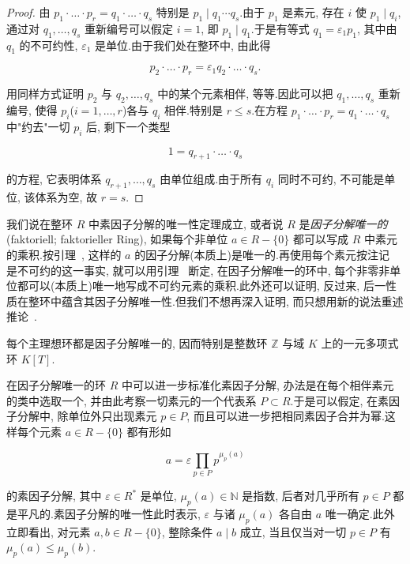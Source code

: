 \begin{proof}
由 $p_1 \cdot \ldots \cdot p_r = q_1 \cdot \ldots \cdot q_s$ 特别是 $p_1 \mid q_1 \cdots q_s$.由于 $p_1$ 是素元, 存在 $i$ 使 $p_1 \mid q_i$, 通过对 $q_1, \ldots, q_s$ 重新编号可以假定 $i = 1$, 即 $p_1 \mid q_1$.于是有等式 $q_1 = \varepsilon_1 p_1$, 其中由 $q_1$ 的不可约性, $\varepsilon_1$ 是单位.由于我们处在整环中, 由此得

\[
p_2 \cdot \ldots \cdot p_r = \varepsilon_1 q_2 \cdot \ldots \cdot q_s\text{.}
\]

用同样方式证明 $p_2$ 与 $q_2, \ldots, q_s$ 中的某个元素相伴, 等等.因此可以把 $q_1, \ldots, q_s$ 重新编号, 使得 $p_i$($i = 1, \ldots, r$)各与 $q_i$ 相伴.特别是 $r \leq s$.在方程 $p_1 \cdot \ldots \cdot p_r = q_1 \cdot \ldots \cdot q_s$ 中"约去"一切 $p_i$ 后, 剩下一个类型

\[
1 = q_{r + 1} \cdot \ldots \cdot q_s
\]

的方程, 它表明体系 $q_{r + 1}, \ldots, q_s$ 由单位组成.由于所有 $q_i$ 同时不可约, 不可能是单位, 该体系为空, 故 $r = s$.
\end{proof}

我们说在整环 $R$ 中素因子分解的唯一性定理成立, 或者说 $R$ 是\emph{因子分解唯一的}(\textup{faktoriell; faktorieller Ring}), 如果每个非单位 $a \in R - \{0\}$ 都可以写成 $R$ 中素元的乘积.按引理~, 这样的 $a$ 的因子分解(本质上)是唯一的.再使用每个素元按注记~ 是不可约的这一事实, 就可以用引理~ 断定, 在因子分解唯一的环中, 每个非零非单位都可以(本质上)唯一地写成不可约元素的乘积.此外还可以证明, 反过来, 后一性质在整环中蕴含其因子分解唯一性.但我们不想再深入证明, 而只想用新的说法重述推论~.

\begin{theorem}\label{thm:5.2.15}
每个主理想环都是因子分解唯一的, 因而特别是整数环 $\mathbb{Z}$ 与域 $K$ 上的一元多项式环 $K[T]$.
\end{theorem}

在因子分解唯一的环 $R$ 中可以进一步标准化素因子分解, 办法是在每个相伴素元的类中选取一个, 并由此考察一切素元的一个代表系 $P \subset R$.于是可以假定, 在素因子分解中, 除单位外只出现素元 $p \in P$, 而且可以进一步把相同素因子合并为幂.这样每个元素 $a \in R - \{0\}$ 都有形如

\[
a = \varepsilon \prod_{p \in P} p^{\mu_p(a)}
\]

的素因子分解, 其中 $\varepsilon \in R^*$ 是单位, $\mu_p(a) \in \mathbb{N}$ 是指数, 后者对几乎所有 $p \in P$ 都是平凡的.素因子分解的唯一性此时表示, $\varepsilon$ 与诸 $\mu_p(a)$ 各自由 $a$ 唯一确定.此外立即看出, 对元素 $a, b \in R - \{0\}$, 整除条件 $a \mid b$ 成立, 当且仅当对一切 $p \in P$ 有 $\mu_p(a) \leq \mu_p(b)$.


